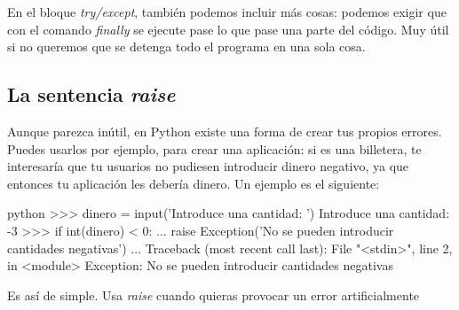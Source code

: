 \documentclass{article}
\begin{document}
En el bloque \textit{try/except}, también podemos incluir más cosas: podemos exigir que con el comando \textit{finally} se ejecute pase lo que pase una parte del código. Muy útil si no queremos que se detenga todo el programa en una sola cosa.
\subsection{La sentencia \textit{raise}}
Aunque parezca inútil, en Python existe una forma de crear tus propios errores. Puedes usarlos por ejemplo, para crear una aplicación: si es una billetera, te interesaría que tu usuarios no pudiesen introducir  dinero negativo, ya que entonces tu aplicación les debería dinero. Un ejemplo es el siguiente:
\begin{mintedbox}{python}
>>> dinero = input('Introduce una cantidad: ')
Introduce una cantidad: -3
>>> if int(dinero) < 0:
...     raise Exception('No se pueden introducir cantidades negativas')
... 
Traceback (most recent call last):
  File "<stdin>", line 2, in <module>
Exception: No se pueden introducir cantidades negativas

\end{mintedbox}
Es así de simple. Usa \textit{raise} cuando quieras provocar un error artificialmente
\end{document}
